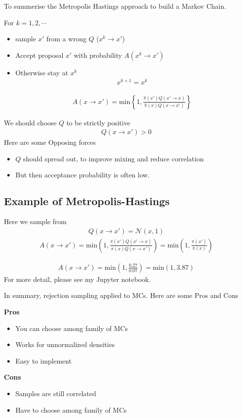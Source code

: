 \documentclass[11pt, oneside, reqno]{amsart}
\numberwithin{equation}{section}
\theoremstyle{plain}%
\theoremstyle{definition}
\theoremstyle{remark}
\begin{document}
To summerise the Metropolis Hastings approach to build a Markov Chain.

For $k=1,2,\cdots$
\begin{itemize}
	\item sample $x'$ from a {\color{red}wrong} $Q$ ($x^k\to x'$)
	\item Accept proposal $x'$ with probability $A(x^k\to x')$
	\item Otherwise stay at $x^k$
	\begin{align*}
		x^{k+1}=x^k
	\end{align*}

\begin{align*}
	A(x\to x')=\text{min}\left\{1,\frac{\hat{\pi}(x')Q(x'\to x)}{\hat{\pi}(x)Q(x\to x')}\right\}
\end{align*}
\end{itemize}
We should choose $Q$ to be strictly positive 
\begin{align*}
	Q(x\to x')>0
\end{align*}
Here are some {\color{red}Opposing forces}
\begin{itemize}
	\item $Q$ should spread out, to improve mixing and reduce correlation
	\item But then acceptance probability is often low.
\end{itemize}
\subsection{Example of Metropolis-Hastings}
Here we sample from 
\begin{align*}
	Q(x\to x')=\mathcal{N}(x,1)
\end{align*}
\begin{align*}
	A(x\to x')=\text{min}\left(1,\frac{\pi(x')Q(x'\to x)}{\pi(x)Q(x\to x')}\right)
	=\text{min}\left(1,\frac{\pi(x')}{\pi(x)}\right)
\end{align*}

\begin{align*}
	A(x\to x')=\text{min}\left(1,\frac{0.27}{0.07}\right)=\text{min}(1,3.87)
\end{align*}
For more detail, please see my Jupyter notebook.

In summary, rejection sampling applied to MCs. Here are some Pros and Cons

\textbf{Pros}
\begin{itemize}
	\item You can choose among family of MCs
	\item Works for unnormalized densities
	\item Easy to implement
\end{itemize}
\textbf{Cons}
\begin{itemize}
	\item Samples are still correlated
	\item Have to choose among family of MCs
\end{itemize}
\end{document}
